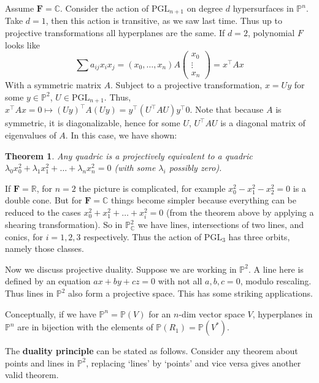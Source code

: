 \documentclass[12pt]{article}
\newcommand{\F}{\mathbf{F}}
\newcommand{\C}{\mathbb{C}}
\newcommand{\R}{\mathbb{R}}
\renewcommand{\P}{\mathbb{P}}
\newcommand{\PGL}{\mathrm{PGL}}
\newtheorem{theorem}{Theorem}[section]
\begin{document}
    Assume $\F = \C$. Consider  the action of $\PGL_{n+1}$ on degree $d$ hypersurfaces in $\P^n$. Take $d = 1$, then this action is transitive, as we saw last time. Thus up to projective transformations all hyperplanes are the same. If $d = 2$, polynomial $F$ looks like 
    $$\sum a_{ij} x_i x_j = (x_0, \dots, x_n) A \begin{pmatrix}
        x_0 \\
        \vdots \\
        x_n
    \end{pmatrix} = x^\top A x$$
    With a symmetric matrix $A$. Subject to a projective transformation, $x = Uy$ for some $y \in \P^2$, $U \in \PGL_{n+1}$. Thus, $x^\top A x = 0 \mapsto (Uy)^\top A (Uy) = y^\top (U^\top A U) y^\top 0$. Note that because $A$ is symmetric, it is diagonalizable, hence for some $U$, $U^\top A U$ is a diagonal matrix of eigenvalues of $A$. In this case, we have shown:
    \begin{theorem}
        Any quadric is a projectively equivalent to a quadric $\lambda_0x_0^2 + \lambda_1x_1^2 + \dots + \lambda_nx_n^2 = 0$ (with some $\lambda_i$ possibly zero). 
    \end{theorem}
    If $\F = \R$, for $n = 2$ the picture is complicated, for example $x_0^2 - x_1^2 - x_2^2 = 0$ is a double cone. But for $\F = \C$ things become simpler because everything can be reduced to the cases $x_0^2 + x_1^2 + \dots + x_i^2 = 0$ (from the theorem above by applying a shearing transformation). So in $\P_\C^2$ we have lines, intersections of two lines, and conics, for $i = 1, 2, 3$ respectively. Thus the action of $\PGL_3$ has three orbits, namely those classes. \par 
    Now we discuss projective duality. Suppose we are working in $\P^2$. A line here is defined by an equation $ax + by + cz = 0$ with not all $a, b, c = 0$, modulo rescaling. Thus lines in $\P^2$ also form a projective space. This has some striking applications. \par
    Conceptually, if we have $\P^n = \P(V)$ for an $n$-dim vector space $V$, hyperplanes in $\P^n$ are in bijection with the elements of $\P(R_1) = \P(V^*)$. \par 
    The \textbf{duality principle} can be stated as follows. Consider any theorem about points and lines in $\P^2$, replacing `lines' by `points' and vice versa gives another valid theorem. 
\end{document}
